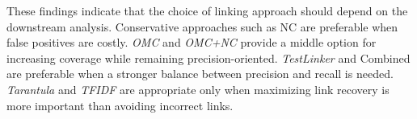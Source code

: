 
These findings indicate that the choice of linking approach should depend on the downstream analysis. Conservative approaches such as NC are preferable when false positives are costly. \emph{OMC} and \emph{OMC+NC} provide a middle option for increasing coverage while remaining precision-oriented. \emph{TestLinker} and Combined are preferable when a stronger balance between precision and recall is needed. \emph{Tarantula} and \emph{TFIDF} are appropriate only when maximizing link recovery is more important than avoiding incorrect links.





